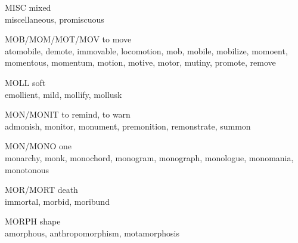 \begin{flashcard}[Roots]{MISC}
mixed\\
\vspace{0.2in}
miscellaneous, promiscuous\\
\end{flashcard}

\begin{flashcard}[Roots]{MOB/MOM/MOT/MOV}
to move\\
\vspace{0.2in}
atomobile, demote, immovable, locomotion, mob, mobile, mobilize, momoent, momentous, momentum, motion, motive, motor, mutiny, promote, remove\\
\end{flashcard}

\begin{flashcard}[Roots]{MOLL}
soft\\
\vspace{0.2in}
emollient, mild, mollify, mollusk\\
\end{flashcard}

\begin{flashcard}[Roots]{MON/MONIT}
to remind, to warn\\
\vspace{0.2in}
admonish, monitor, monument, premonition, remonstrate, summon\\
\end{flashcard}

\begin{flashcard}[Roots]{MON/MONO}
one\\
\vspace{0.2in}
monarchy, monk, monochord, monogram, monograph, monologue, monomania, monotonous\\
\end{flashcard}

\begin{flashcard}[Roots]{MOR/MORT}
death\\
\vspace{0.2in}
immortal, morbid, moribund\\
\end{flashcard}

\begin{flashcard}[Roots]{MORPH}
shape\\
\vspace{0.2in}
amorphous, anthropomorphism, motamorphosis\\
\end{flashcard}

